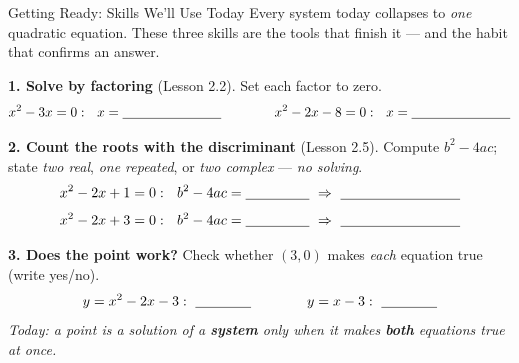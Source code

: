 \documentclass[10pt]{article}
\begin{document}

\vspace{0.10in}

\begin{notesbox}{Getting Ready: Skills We'll Use Today}
\small Every system today collapses to \emph{one} quadratic equation. These three skills are the tools that
finish it --- and the habit that confirms an answer.

\vspace{4pt}
\textbf{1. Solve by factoring} (Lesson 2.2). Set each factor to zero.
\[
  x^2-3x=0:\ \ x=\blank{2.6cm} \qquad\qquad x^2-2x-8=0:\ \ x=\blank{2.6cm}
\]

\vspace{4pt}
\textbf{2. Count the roots with the discriminant} (Lesson 2.5). Compute $b^2-4ac$; state \emph{two real},
\emph{one repeated}, or \emph{two complex} --- \emph{no solving}.
\[
  x^2-2x+1=0:\ \ b^2-4ac=\blank{1.6cm}\ \Rightarrow\ \blank{3.0cm}
\]
\[
  x^2-2x+3=0:\ \ b^2-4ac=\blank{1.6cm}\ \Rightarrow\ \blank{3.0cm}
\]

\vspace{4pt}
\textbf{3. Does the point work?} Check whether $(3,0)$ makes \emph{each} equation true (write yes/no).
\[
  y=x^2-2x-3:\ \blank{1.4cm} \qquad\qquad y=x-3:\ \blank{1.4cm}
\]
\emph{Today: a point is a solution of a \textbf{system} only when it makes \textbf{both} equations true at once.}
\end{notesbox}
\end{document}
